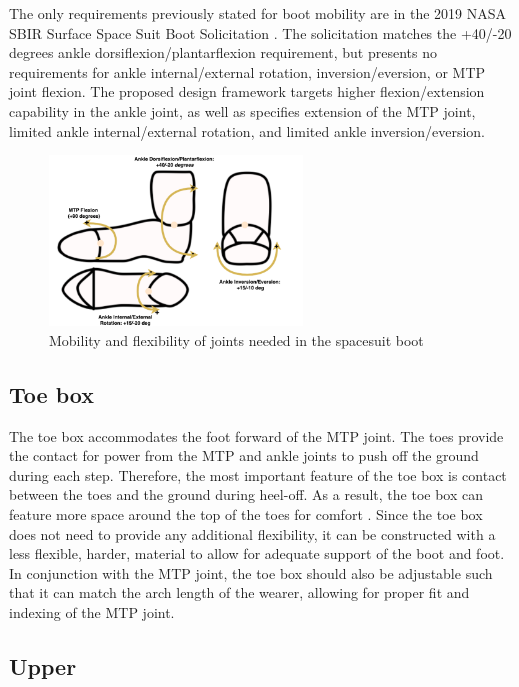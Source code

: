 \documentclass[defaultstyle,11pt]{comps}
\begin{document}
The only requirements previously stated for boot mobility are in the 2019 NASA SBIR Surface Space Suit Boot Solicitation \citep{NASA2019}.
The solicitation matches the +40/-20 degrees ankle dorsiflexion/plantarflexion requirement, but presents no requirements for ankle internal/external rotation, inversion/eversion, or MTP joint flexion.
The proposed design framework targets higher flexion/extension capability in the ankle joint, as well as specifies extension of the MTP joint, limited ankle internal/external rotation, and limited ankle inversion/eversion.

\begin{figure}
\hypertarget{fig:SA3-Mobility}{%
\centering
\includegraphics[width=0.6\textwidth,height=\textheight]{../fig/SA3/Mobility.png}
\caption{Mobility and flexibility of joints needed in the spacesuit boot}\label{fig:SA3-Mobility}
}
\end{figure}

\hypertarget{toe-box}{%
\subsection{Toe box}\label{toe-box}}

The toe box accommodates the foot forward of the MTP joint.
The toes provide the contact for power from the MTP and ankle joints to push off the ground during each step.
Therefore, the most important feature of the toe box is contact between the toes and the ground during heel-off.
As a result, the toe box can feature more space around the top of the toes for comfort \citep{Luximon2009}.
Since the toe box does not need to provide any additional flexibility, it can be constructed with a less flexible, harder, material to allow for adequate support of the boot and foot.
In conjunction with the MTP joint, the toe box should also be adjustable such that it can match the arch length of the wearer, allowing for proper fit and indexing of the MTP joint.

\hypertarget{upper}{%
\subsection{Upper}\label{upper}}
\end{document}
